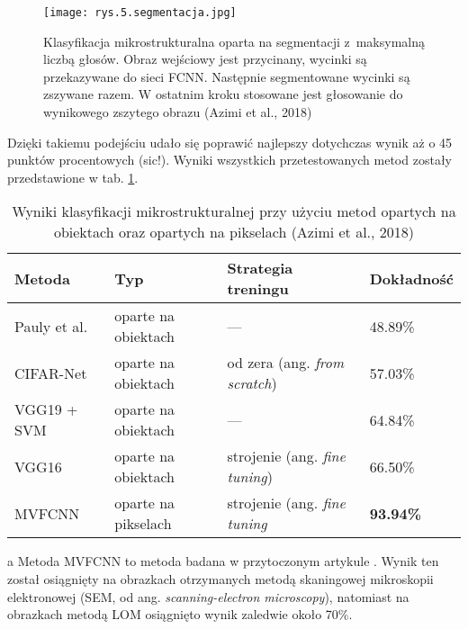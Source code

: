 \begin{figure}[h]
    \centering
    \texttt{[image: rys.5.segmentacja.jpg]}
    \caption{Klasyfikacja mikrostrukturalna oparta na segmentacji z~maksymalną liczbą głosów. Obraz wejściowy jest przycinany, wycinki są przekazywane do sieci FCNN. Następnie segmentowane wycinki są zszywane razem. W ostatnim kroku stosowane jest głosowanie do wynikowego zszytego obrazu (Azimi et al., 2018)}
    \label{fig:mesh5}
\end{figure}
Dzięki takiemu podejściu udało się poprawić najlepszy dotychczas wynik aż o 45 punktów procentowych (sic!). Wyniki wszystkich przetestowanych metod zostały przedstawione w tab. \ref{tab:tab1}.

\begin{table}[h]
	\centering
	\begin{threeparttable}
		\caption{Wyniki klasyfikacji mikrostrukturalnej przy użyciu metod opartych na obiektach oraz opartych na pikselach (Azimi et al., 2018)}
		\label{tab:tab1}
		\begin{tabularx}{1\textwidth}{ |X|X|X|X| }
  \hline
   \textbf{Metoda} & \textbf{Typ} & \textbf{Strategia treningu} & \textbf{Dokładność}\\
  \hline
  Pauly et al. \cite{Pauly16} & oparte na obiektach & — & 48.89\%\\
  \hline
  CIFAR-Net & oparte na obiektach & od zera (ang. \textit{from scratch}) & 57.03\%\\
  \hline
  VGG19 + SVM & oparte na obiektach & — & 64.84\%\\
  \hline
  VGG16 & oparte na obiektach & strojenie (ang. \textit{fine tuning}) & 66.50\%\\
  \hline
  MVFCNN\tnote{a} & oparte na pikselach & strojenie (ang. \textit{fine tuning} & \textbf{93.94\%}\\
  \hline
\end{tabularx}
		\begin{tablenotes}
			\footnotesize
			\item[a] Metoda MVFCNN to metoda badana w przytoczonym artykule \cite{Azimi18}. Wynik ten został osiągnięty na obrazkach otrzymanych metodą skaningowej mikroskopii elektronowej (SEM, od ang. \textit{scanning-electron microscopy}), natomiast na obrazkach metodą LOM osiągnięto wynik zaledwie około 70\%.\textellipsis
		\end{tablenotes}
	\end{threeparttable}
\end{table}

